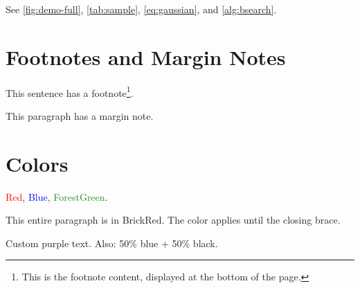 \documentclass[a4paper,12pt]{article}
\begin{document}
%
%

See \cref{fig:demo-full}, \cref{tab:sample}, \cref{eq:gaussian}, and \cref{alg:bsearch}.

\section{Footnotes and Margin Notes}

This sentence has a footnote\footnote{This is the footnote content, displayed at the bottom of the page.}.

This paragraph has a margin note.

\section{Colors}

\textcolor{red}{Red}, \textcolor{blue}{Blue}, \textcolor{ForestGreen}{ForestGreen}.

{\color{BrickRed} This entire paragraph is in BrickRed. The color applies until the closing brace.}

%
\textcolor{CustomPurple}{Custom purple text}. Also: \textcolor{blue!50!black}{50\% blue + 50\% black}.
\end{document}
